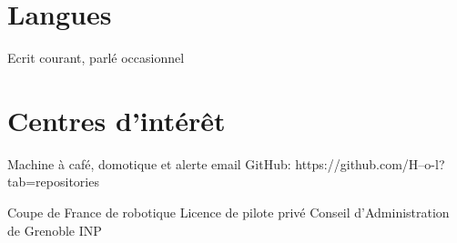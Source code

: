 \documentclass[11pt,a4paper]{moderncv}
\begin{document}
\section{Langues}

  {Ecrit courant, parlé occasionnel\newline{}}

\section{Centres d'intérêt}
  {Machine à café, domotique et alerte email\newline{}
          GitHub: https://github.com/H--o-l?tab=repositories\newline{}}

  {Coupe de France de robotique\newline{}
          Licence de pilote privé\newline{}
          Conseil d'Administration de Grenoble INP}
\end{document}
